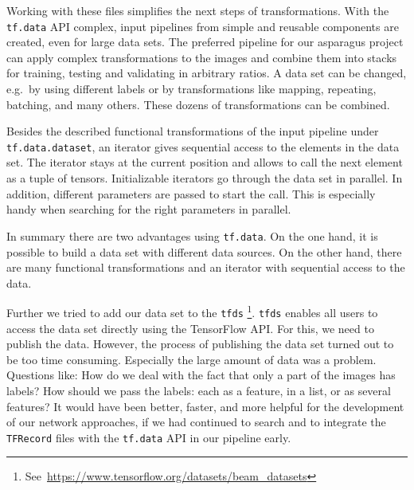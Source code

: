 Working with these files simplifies the next steps of transformations. With the \mbox{\texttt{tf.data}} API complex, input pipelines from simple and reusable components are created, even for large data sets. The preferred pipeline for our asparagus project can apply complex transformations to the images and combine them into stacks for training, testing and validating in arbitrary ratios. A data set can be changed, e.g.\ by using different labels or by transformations like mapping, repeating, batching, and many others. These dozens of transformations can be combined.

Besides the described functional transformations of the input pipeline under \mbox{\texttt{tf.data.dataset}}, an iterator gives sequential access to the elements in the data set. The iterator stays at the current position and allows to call the next element as a tuple of tensors. Initializable iterators go through the data set in parallel. In addition, different parameters are passed to start the call. This is especially handy when searching for the right parameters in parallel.

In summary there are two advantages using \texttt{tf.data}. On the one hand, it is possible to build a data set with different data sources. On the other hand, there are many functional transformations and an iterator with sequential access to the data.

\bigskip
Further we tried to add our data set to the \texttt{\acrshort{tfds}} \footnote{See~\url{https://www.tensorflow.org/datasets/beam\_datasets}}. \texttt{\acrshort{tfds}} enables all users to access the data set directly using the TensorFlow API. For this, we need to publish the data. However, the process of publishing the data set turned out to be too time consuming. Especially the large amount of data was a problem. Questions like: How do we deal with the fact that only a part of the images has labels? How should we pass the labels: each as a feature, in a list, or as several features? It would have been better, faster, and more helpful for the development of our network approaches, if we had continued to search and to integrate the \texttt{TFRecord} files with the \mbox{\texttt{tf.data}} API in our pipeline early. 
